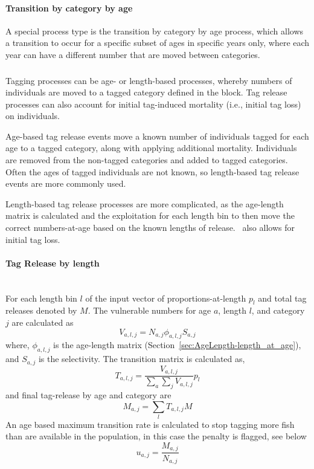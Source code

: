\paragraph{Transition by category by age}\label{sec:Process-TransitionCategoryByAge}

A special process type is the transition by category by age process, which allows a transition to occur for a specific subset of ages in specific years only, where each year can have a different number that are moved between categories.

\subsubsection{}\label{sec:Process-TagByAge}\label{sec:Process-TagByLength} 

Tagging processes can be age- or length-based processes, whereby numbers of individuals are moved to a tagged category defined in the  block. Tag release processes can also account for initial tag-induced mortality (i.e., initial tag loss) on individuals.

Age-based tag release events move a known number of individuals tagged for each age to a tagged category, along with applying additional mortality. Individuals are removed from the non-tagged categories and added to tagged categories. Often the ages of tagged individuals are not known, so length-based tag release events are more commonly used.

Length-based tag release processes are more complicated, as the age-length matrix is calculated and the exploitation for each length bin to then move the correct numbers-at-age based on the known lengths of release. \CNAME\ also allows for initial tag loss.

\paragraph*{{Tag Release by length}}
\\

For each length bin $l$ of the input vector of proportions-at-length ${p}_l$ and total tag releases denoted by \(M\). The vulnerable numbers for age \(a\), length \(l\), and category \(j\) are calculated as
$$V_{a,l,j} = N_{a,j} \phi_{a,l,j} S_{a,j}$$
where, \(\phi_{a,l,j}\) is the age-length matrix (Section~\ref{sec:AgeLength-length_at_age}), and \(S_{a,j}\) is the selectivity. The transition matrix is calculated as,
$$ T_{a,l,j}= \frac{V_{a,l,j}}{\sum_a\sum_j V_{a,l,j}} {p}_l$$
and final tag-release by age and category are
$$ M_{a,j} = \sum_l T_{a,l,j}M  $$
An age based maximum transition rate is calculated to stop tagging more fish than are available in the population, in this case the penalty is flagged, see below
$$ u_{a,j} = \frac{ M_{a,j} }{N_{a,j} }  $$

